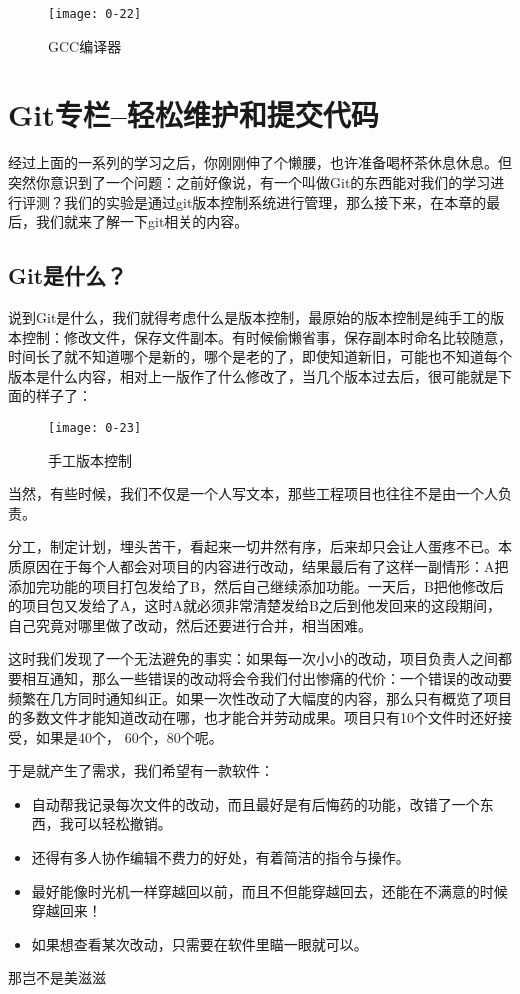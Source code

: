 \begin{figure}[htbp]
  \centering
  \texttt{[image: 0-22]}
  \caption{GCC编译器}\label{fig:0-22}
\end{figure}

\section{Git专栏--轻松维护和提交代码}
经过上面的一系列的学习之后，你刚刚伸了个懒腰，也许准备喝杯茶休息休息。但突然你意识到了一个问题：之前好像说，有一个叫做Git的东西能对我们的学习进行评测？我们的实验是通过git版本控制系统进行管理，那么接下来，在本章的最后，我们就来了解一下git相关的内容。
\subsection{Git是什么？}
说到Git是什么，我们就得考虑什么是版本控制，最原始的版本控制是纯手工的版本控制：修改文件，保存文件副本。有时候偷懒省事，保存副本时命名比较随意，时间长了就不知道哪个是新的，哪个是老的了，即使知道新旧，可能也不知道每个版本是什么内容，相对上一版作了什么修改了，当几个版本过去后，很可能就是下面的样子了：
\begin{figure}[htbp]
  \centering
  \texttt{[image: 0-23]}
  \caption{手工版本控制}\label{fig:0-23}
\end{figure}

当然，有些时候，我们不仅是一个人写文本，那些工程项目也往往不是由一个人负责。

分工，制定计划，埋头苦干，看起来一切井然有序，后来却只会让人蛋疼不已。本质原因在于每个人都会对项目的内容进行改动，结果最后有了这样一副情形：A把添加完功能的项目打包发给了B，然后自己继续添加功能。一天后，B把他修改后的项目包又发给了A，这时A就必须非常清楚发给B之后到他发回来的这段期间，自己究竟对哪里做了改动，然后还要进行合并，相当困难。

这时我们发现了一个无法避免的事实：如果每一次小小的改动，项目负责人之间都要相互通知，那么一些错误的改动将会令我们付出惨痛的代价：一个错误的改动要频繁在几方同时通知纠正。如果一次性改动了大幅度的内容，那么只有概览了项目的多数文件才能知道改动在哪，也才能合并劳动成果。项目只有10个文件时还好接受，如果是40个， 60个，80个呢。

于是就产生了需求，我们希望有一款软件：
\begin{itemize}
    \item 自动帮我记录每次文件的改动，而且最好是有后悔药的功能，改错了一个东西，我可以轻松撤销。
	\item 还得有多人协作编辑不费力的好处，有着简洁的指令与操作。
	\item 最好能像时光机一样穿越回以前，而且不但能穿越回去，还能在不满意的时候穿越回来！
	\item 如果想查看某次改动，只需要在软件里瞄一眼就可以。
\end{itemize}
那岂不是美滋滋~

